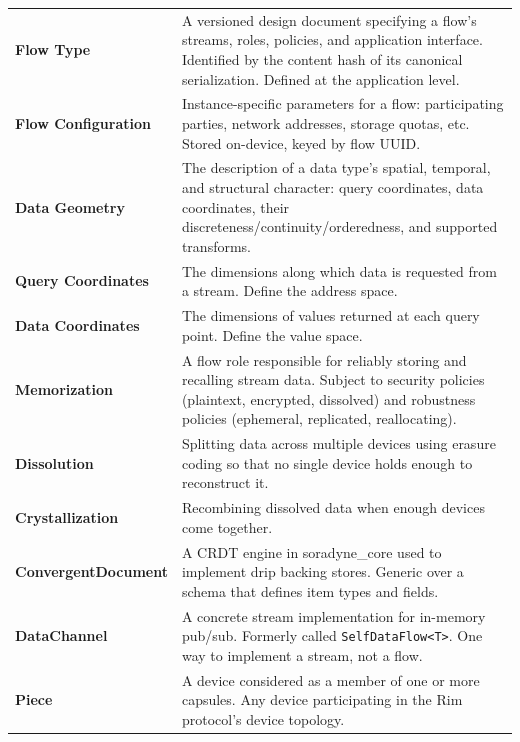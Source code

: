\documentclass[11pt, letterpaper]{article}
\begin{document}
\begin{center}
\begin{longtable}{l p{10cm}}
\textbf{Flow Type} &
  A versioned design document specifying a flow's streams, roles, policies, and
  application interface. Identified by the content hash of its canonical serialization.
  Defined at the application level. \\[6pt]

\textbf{Flow Configuration} &
  Instance-specific parameters for a flow: participating parties, network addresses,
  storage quotas, etc. Stored on-device, keyed by flow UUID. \\[6pt]

\textbf{Data Geometry} &
  The description of a data type's spatial, temporal, and structural character: query
  coordinates, data coordinates, their discreteness/continuity/orderedness, and
  supported transforms. \\[6pt]

\textbf{Query Coordinates} &
  The dimensions along which data is requested from a stream. Define the address space.
  \\[6pt]

\textbf{Data Coordinates} &
  The dimensions of values returned at each query point. Define the value space.
  \\[6pt]

\textbf{Memorization} &
  A flow role responsible for reliably storing and recalling stream data. Subject to
  security policies (plaintext, encrypted, dissolved) and robustness policies
  (ephemeral, replicated, reallocating). \\[6pt]

\textbf{Dissolution} &
  Splitting data across multiple devices using erasure coding so that no single device
  holds enough to reconstruct it. \\[6pt]

\textbf{Crystallization} &
  Recombining dissolved data when enough devices come together. \\[6pt]

\textbf{ConvergentDocument} &
  A CRDT engine in soradyne\_core used to implement drip backing stores. Generic over
  a schema that defines item types and fields. \\[6pt]

\textbf{DataChannel} &
  A concrete stream implementation for in-memory pub/sub. Formerly called
  \texttt{SelfDataFlow<T>}. One way to implement a stream, not a flow. \\[6pt]

\textbf{Piece} &
  A device considered as a member of one or more capsules. Any device participating
  in the Rim protocol's device topology. \\[6pt]


\end{longtable}
\end{center}
\end{document}
